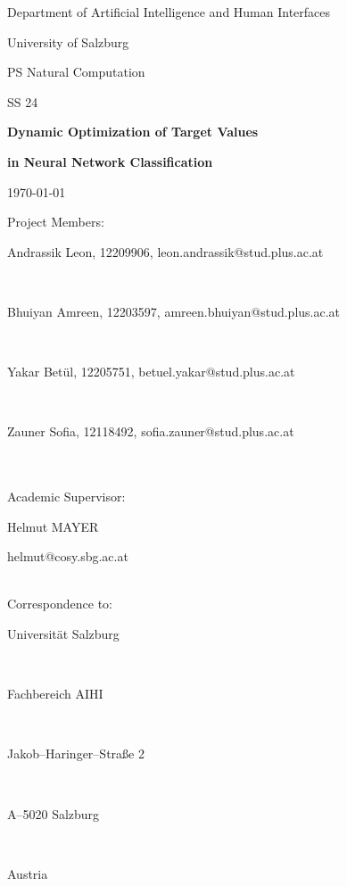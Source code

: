 \documentclass[12pt,fleqn,a4paper]{article}
\begin{document}
\begin{titlepage}%
\vspace{2cm}
\centerline{
\large{Department of Artificial Intelligence and Human Interfaces}}
\vspace{0.2cm}
\centerline{\large{University of Salzburg}}%
\vspace{1cm}

\centerline{\large{PS Natural Computation}}
\centerline{SS 24}
\vspace{1cm}

\centerline{\Large\textbf{Dynamic Optimization of Target Values}}
\vspace{0.3cm}
\centerline{\Large\textbf{in Neural Network Classification}}
\vspace{1cm}

\vspace{0.4cm}%
\centerline{\today}
\vspace{5cm}%

\vspace{0.2cm}
Project Members:\\
\centerline{Andrassik Leon, 12209906, leon.andrassik@stud.plus.ac.at}\\
\centerline{Bhuiyan Amreen, 12203597, amreen.bhuiyan@stud.plus.ac.at}\\
\centerline{Yakar Bet\"ul, 12205751, betuel.yakar@stud.plus.ac.at}\\
\centerline{Zauner Sofia, 12118492, sofia.zauner@stud.plus.ac.at}\\
\vspace {1cm}\\

Academic Supervisor: \\
\centerline{Helmut MAYER}
\centerline{helmut@cosy.sbg.ac.at}
\vspace{1.5cm}\\
Correspondence to: \\
\centerline{Universit\"{a}t Salzburg} \\
\centerline{Fachbereich AIHI} \\
\centerline{Jakob--Haringer--Stra\ss e 2} \\
\centerline{A--5020 Salzburg} \\
\centerline{Austria}
\clearpage
\end{titlepage}


\clearpage
\pagestyle{headings}
\setcounter{page}{1}
\setcounter{page}{1}
\end{document}
